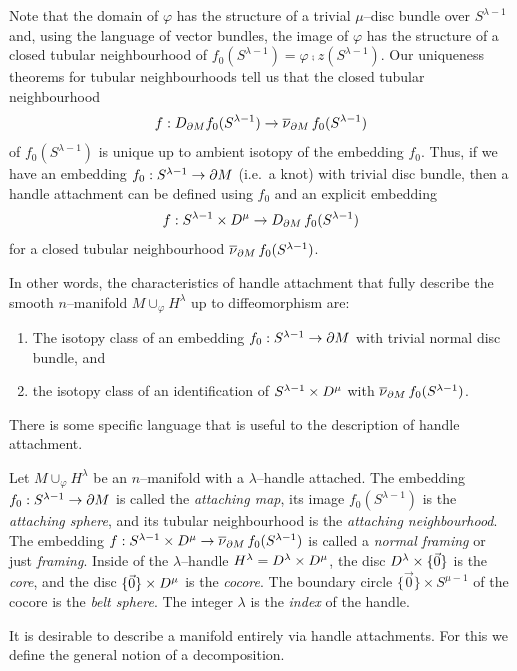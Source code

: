 Note that the domain of $\varphi$ has the structure of a trivial $\mu$--disc bundle over $S^{\lambda-1}$ and, using the language of vector bundles, the image of $\varphi$ has the structure of a closed tubular neighbourhood of $f_0(S^{\lambda-1})=\varphi\comp z(S^{\lambda-1})$.
Our uniqueness theorems for tubular neighbourhoods tell us that the closed tubular neighbourhood
\[
	f:D_{\partial M}f_0(S^{\lambda-1})\to\overline{\nu}_{\partial M}\,f_0(S^{\lambda-1})
\]
of $f_0(S^{\lambda-1})$ is unique up to ambient isotopy of the embedding $f_0$.
Thus, if we have an embedding $f_0:S^{\lambda-1}\to \partial M$ (i.e.\ a knot) with trivial disc bundle, then a handle attachment can be defined using $f_0$ and an explicit embedding 
\[
	f: S^{\lambda-1}\times D^\mu\to D_{\partial M}\,f_0(S^{\lambda-1})
\]
for a closed tubular neighbourhood $\overline{\nu}_{\partial M}\,f_0(S^{\lambda-1})$.

In other words, the characteristics of handle attachment that fully describe the smooth $n$--manifold $M\cup_\varphi H^\lambda$ up to diffeomorphism are:
\begin{enumerate}
	\item The isotopy class of an embedding $f_0:S^{\lambda-1}\to\partial M$ with trivial normal disc bundle, and 
	\item the isotopy class of an identification of $S^{\lambda-1}\times D^\mu$ with $\overline{\nu}_{\partial M}\,f_0(S^{\lambda-1})$.
\end{enumerate}

There is some specific language that is useful to the description of handle attachment.

\begin{defn}
	Let $M\cup_\varphi H^\lambda$ be an $n$--manifold with a $\lambda$--handle attached.
	The embedding $f_0:S^{\lambda-1}\to\partial M$ is called the \emph{attaching map}, its image $f_0(S^{\lambda-1})$ is the \emph{attaching sphere}, and its tubular neighbourhood is the \emph{attaching neighbourhood}.
	The embedding $f: S^{\lambda-1}\times D^\mu\to \overline{\nu}_{\partial M}\,f_0(S^{\lambda-1})$ is called a \emph{normal framing} or just \emph{framing}.
	Inside of the $\lambda$--handle $H^\lambda=D^\lambda\times D^\mu$, the disc $D^\lambda\times\{\vec{0}\}$ is the \emph{core}, and the disc $\{\vec{0}\}\times D^\mu$ is the \emph{cocore}.
	The boundary circle $\{\vec{0}\}\times S^{\mu-1}$ of the cocore is the \emph{belt sphere}.
	The integer $\lambda$ is the \emph{index} of the handle.
\end{defn}

It is desirable to describe a manifold entirely via handle attachments.
For this we define the general notion of a decomposition.

